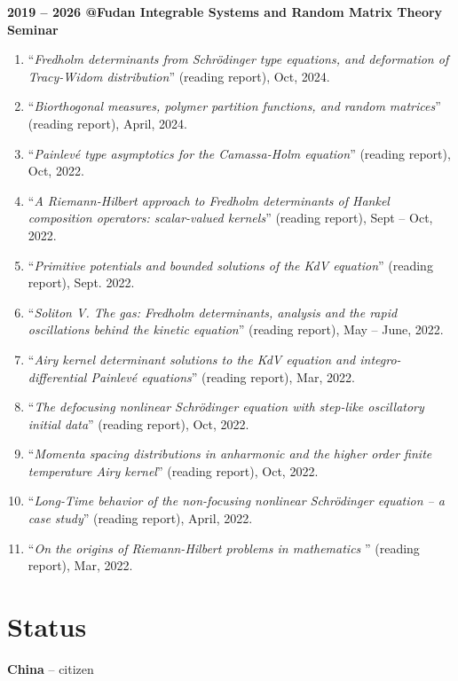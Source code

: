 \documentclass[margin]{res}
\begin{document}
\begin{resume}
\textbf{2019 -- 2026 @Fudan Integrable Systems and Random Matrix Theory Seminar }
\begin{enumerate}[--]
\item ``{\sl Fredholm determinants from Schr\"odinger type equations, and deformation of Tracy-Widom distribution}'' (reading report), Oct, 2024.
\item ``{\sl Biorthogonal measures, polymer partition functions, and random matrices}'' (reading report), April, 2024.
\item ``{\sl Painlev\'e type asymptotics for the Camassa-Holm equation}'' (reading report), Oct, 2022.
\item ``{\sl A Riemann-Hilbert approach to Fredholm determinants of Hankel composition operators: scalar-valued kernels}'' (reading report), Sept -- Oct, 2022.
\item ``{\sl Primitive potentials and bounded solutions of the KdV equation}'' (reading report), Sept. 2022.
\item ``{\sl Soliton V. The gas: Fredholm determinants, analysis and the rapid oscillations behind the kinetic equation}'' (reading report), May -- June, 2022.
\item ``{\sl Airy kernel determinant solutions to the KdV equation and integro-differential Painlev\'e equations}'' (reading report), Mar, 2022.
\item ``{\sl The defocusing nonlinear Schr\"odinger equation with step-like oscillatory initial data}'' (reading report), Oct, 2022.
\item ``{\sl Momenta spacing distributions in anharmonic and the higher order finite temperature Airy kernel}'' (reading report), Oct, 2022.
\item ``{\sl Long-Time behavior of the non-focusing nonlinear Schr\"odinger equation -- a case study}'' (reading report), April, 2022.
\item ``{\sl On the origins of Riemann-Hilbert problems in mathematics} '' (reading report), Mar, 2022.
\end{enumerate}


\section{Status}
\textbf{China} -- citizen


\end{resume}
\end{document}
